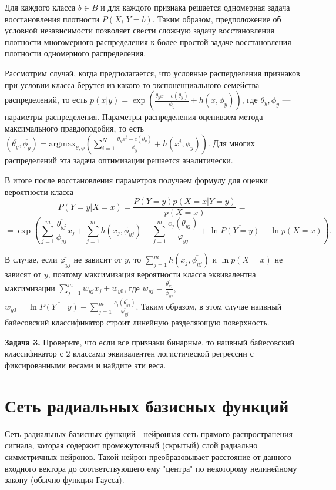 Для каждого класса $b \in B$ и для каждого признака решается одномерная задача восстановления плотности $P(X_i|Y=b)$. Таким образом, предположение об условной независимости позволяет свести сложную задачу восстановления плотности многомерного распределения к более простой задаче восстановления плотности одномерного распределения.

Рассмотрим случай, когда предполагается, что условные расперделения признаков при условии класса берутся из какого-то экспоненциального семейства распределений, то есть $p(x|y) = \exp \left(\frac{\theta_y x-c(\theta_y)}{\phi_y} + h(x, \phi_y) \right)$, где $\theta_y, \phi_y$ --- параметры распределения. Параметры распределения оцениваем метода максимального правдоподобия, то есть $(\overline{\theta_y}, \overline{\phi_y}) = \text{argmax}_{\theta, \phi}\left(\sum_{i=1}^{N} \frac{\theta_yx^i-c(\theta_y)}{\phi_y} + h(x^i, \phi_y) \right)$.
Для многих распределений эта задача оптимизации решается аналитически.

В итоге после восстановления параметров получаем формулу для оценки вероятности класса
$$P(Y=y|X=x) = \frac{P(Y=y)p(X=x|Y=y)}{p(X=x)} = $$ $$ = \exp \left( \sum_{j=1}^{m} \frac{\overline{\theta_{yj}}}{\overline{\phi_{yj}}}x_j + \sum_{j=1}^{m}h(x_j, \overline{\phi_{yj}}) - \sum_{j=1}^{m}\frac{c_j(\overline{\theta_{yj}})}{\overline{\varphi_{yj}}} + \ln \overline{P(Y=y)} - \ln p(X=x) \right).$$

В случае, если $\overline{\varphi_{yj}}$ не зависит от $y$, то $\sum_{j=1}^{m}h(x_j, \overline{\phi_{yj}})$ и $\ln p(X=x)$ не зависят от $y$, поэтому максимизация вероятности класса эквивалентна максимизации $\sum_{j=1}^{m}w_{yj}x_j + w_{y0}$, где $w_{yj}=\frac{\overline{\theta_{yj}}}{\overline{\phi_{yj}}}$, $w_{y0}=\ln \overline{P(Y=y)} - \sum_{j=1}^{m}\frac{c_j(\overline{\theta_{yj}})}{\overline{\varphi_{yj}}}.$ Таким образом, в этом случае наивный байесовский классификатор строит линейную разделяющую поверхность.

\textbf{Задача 3.} Проверьте, что если все признаки бинарные, то наивный байесовский классификатор с $2$ классами эквивалентен логистической регрессии с фиксированными весами и найдите эти веса.


\section*{Сеть радиальных базисных функций}
Сеть радиальных базисных функций - нейронная сеть прямого распространения сигнала, которая содержит промежуточный (скрытый) слой радиально симметричных нейронов. Такой нейрон преобразовывает расстояние от данного входного вектора до соответствующего ему "центра" по некоторому нелинейному закону (обычно функция Гаусса).

